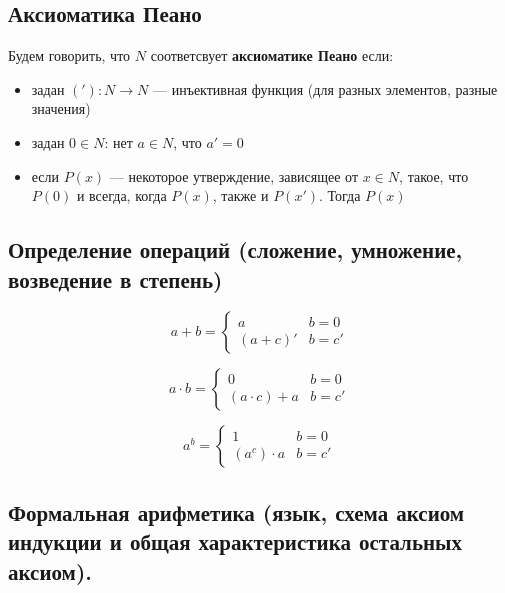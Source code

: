\documentclass[english]{article}
\begin{document}
\subsection{Аксиоматика Пеано}
\label{sec:org61bde88}
\begin{definition}
	Будем говорить, что \(N\) соответсвует \textbf{аксиоматике Пеано} если:
	\begin{itemize}
		\item задан \(('): N \to N\) --- инъективная функция (для разных элементов, разные значения)
		\item задан \(0 \in N\): нет \(a \in N\), что \(a' = 0\)
		\item если \(P(x)\) --- некоторое утверждение, зависящее от \(x \in N\), такое, что \(P(0)\) и всегда, когда \(P(x)\), также и \(P(x')\). Тогда \(P(x)\)
	\end{itemize}
	\label{orgacd9e1a}
\end{definition}
\subsection{Определение операций (сложение, умножение, возведение в степень)}
\label{sec:orgfee98d5}
\begin{definition}
	\[ a + b = \begin{cases}
			a        & b = 0  \\
			(a + c)' & b = c'
		\end{cases}\]
	\label{org3179b45}
\end{definition}
\begin{definition}
	\[ a \cdot b = \begin{cases}
			0               & b = 0  \\
			(a \cdot c) + a & b = c'
		\end{cases}\]
	\label{org8871ba9}
\end{definition}
\begin{definition}
	\[ a^b = \begin{cases}
			1            & b = 0  \\
			(a^c)\cdot a & b = c'
		\end{cases}\]
	\label{org1245388}
\end{definition}
\subsection{Формальная арифметика (язык, схема аксиом индукции и общая характеристика остальных аксиом).}
\label{sec:orgd643e78}
\end{document}
